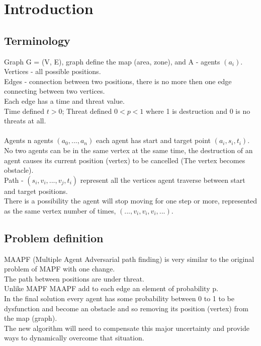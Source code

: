 \documentclass[]{article}
\begin{document}
\renewcommand\maketitle{}
\section{Introduction}
\subsection{Terminology} 
Graph G = (V, E), graph define the map (area, zone), and A - agents $(a_i)$.\\
Vertices - all possible positions.\\
Edges - connection between two positions, there is no more then one edge connecting between two vertices.\\
Each edge has a time and threat value.\\
Time defined $t > 0$; Threat defined $0 < p < 1$ where 1 is destruction and 0 is no threats at all.\\\\
Agents n agents $(a_0, ..., a_n)$ each agent has start and target point $(a_i,s_i,t_i)$.\\
No two agents can be in the same vertex at the same time, the destruction of an agent causes its current position (vertex) to be cancelled (The vertex becomes obstacle).\\
Path - $(s_i, v_i, ..., v_j, t_i)$ represent all the vertices agent traverse between start and target positions.\\
There is a possibility the agent will stop moving for one step or more, represented as the same vertex number of times, $(..., v_i,v_i,v_i, ...)$.
\subsection{Problem definition} 
MAAPF (Multiple Agent Adversarial path finding) is very similar to the original problem of MAPF with one change.\\
The path between positions are under threat.\\
Unlike MAPF MAAPF add to each edge an element of probability p.\\
In the final solution every agent has some probability between 0 to 1 to be dysfunction and become an obstacle and so removing its position (vertex) from the map (graph).\\
The new algorithm will need to compensate this major uncertainty and provide ways to dynamically overcome that situation.
\end{document}

